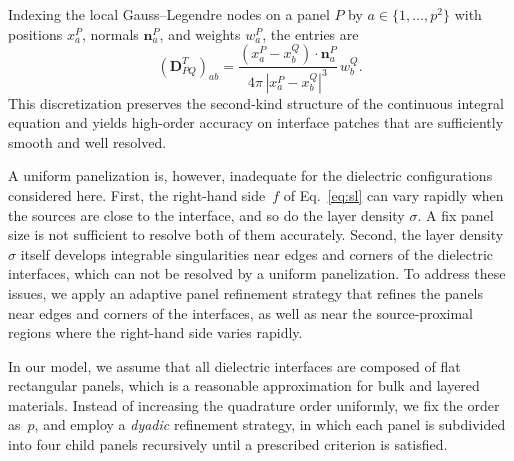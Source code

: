 \documentclass[preprint,12pt]{elsarticle}
\newcommand{\V}[1]{\boldsymbol{#1}}
\newcommand{\M}[1]{\boldsymbol{#1}}
\begin{document}
Indexing the local Gauss--Legendre nodes on a panel $P$ by $a\in\{1,\dots,p^2\}$ with positions $x_a^P$, normals $\V n_a^P$, and weights $w_a^P$, the entries are
\begin{equation}\label{eq:block_entries}
    (\M D^T_{PQ})_{ab} = \frac{(x_a^P-x_b^Q)\cdot\V n_a^P}{4\pi\,|x_a^P-x_b^Q|^3}\,w_b^Q.
\end{equation}
This discretization preserves the second-kind structure of the continuous integral equation and yields high-order accuracy on interface patches that are sufficiently smooth and well resolved.

A uniform panelization is, however, inadequate for the dielectric configurations considered here.
First, the right-hand side~$f$ of Eq.~\eqref{eq:sl} can vary rapidly when the sources are close to the interface, and so do the layer density $\sigma$.
A fix panel size is not sufficient to resolve both of them accurately.
Second, the layer density $\sigma$ itself develops integrable singularities near edges and corners of the dielectric interfaces, which can not be resolved by a uniform panelization.
To address these issues, we apply an adaptive panel refinement strategy that refines the panels near edges and corners of the interfaces, as well as near the source-proximal regions where the right-hand side varies rapidly.

In our model, we assume that all dielectric interfaces are composed of flat rectangular panels, which is a reasonable approximation for bulk and layered materials.
Instead of increasing the quadrature order uniformly, we fix the order as~$p$, and employ a \emph{dyadic} refinement strategy, in which each panel is subdivided into four child panels recursively until a prescribed criterion is satisfied.
\end{document}
